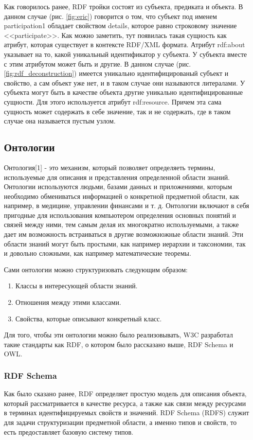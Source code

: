 \documentclass[12pt]{article}
\begin{document}
Как говорилось ранее, RDF тройки состоят из субъекта, предиката и объекта. В данном случае (рис. \ref{fig:eric}) говорится о том, что субъект под именем participation1 обладает свойством details, которое равно строковому значение <<participate>>. Как можно заметить, тут появилась такая сущность как атрибут, которая существует в контексте RDF/XML формата. Атрибут rdf:about указывает на то, какой уникальный идентификатор у субъекта. У субъекта вместе с этим атрибутом может быть и другие. В данном случае (рис. \ref{fig:rdf_deconstruction}) имеется уникально идентифицированый субъект и свойство, а сам объект уже нет, и в таком случае они называются литералами. У субъекта могут быть в качестве объекта другие уникально идентифицированные сущности. Для этого используется атрибут rdf:resource. Причем эта сама сущность может содержать в себе значение, так и не содержать, где в таком случае она называется пустым узлом.

\subsection{Онтологии}
\qquad Онтология[1] - это механизм, который позволяет определяеть термины, используемые для описания и представления определенной области знаний. Онтологии используются людьми, базами данных и приложениями, которым необходимо обмениваться информацией о конкретной предметной области, как например, в медицине, управлении финансами и т. д. Онтологии включают в себя пригодные для использования компьютером определения основных понятий и связей между ними, тем самым делая их многократно используемыми, а также дает им возможность встраиваться в другие возможножные области знаний. Эти области знаний могут быть простыми, как например иерархии и таксономии, так и довольно сложными, как например математические теоремы.

Сами онтологии можно структуризовать следующим образом:
\begin{enumerate}
    \item Классы в интересующей области знаний.
    \item Отношения между этими классами.
    \item Свойства, которые описывают конкретный класс.
\end{enumerate}

Для того, чтобы эти онтологии можно было реализовывать, W3C разработал такие стандарты как RDF, о котором было рассказано выше, RDF Schema и OWL.

\subsubsection{RDF Schema}
\qquad Как было сказано ранее, RDF определяет простую модель для описания объекта, который рассматривается в качестве ресурса, а также как связи между ресурсами в терминах идентифицируемых свойств и значений. RDF Schema (RDFS) служит для задачи структуризации предметной области, а именно типов и свойств, то есть предоставляет базовую систему типов.\par
\end{document}
